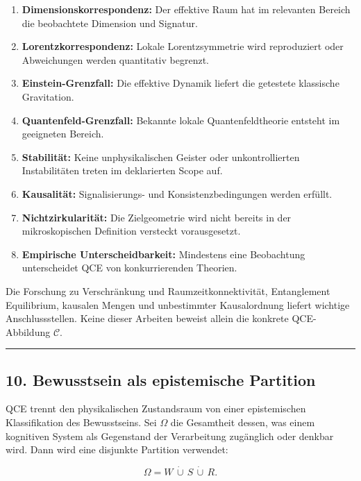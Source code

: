 \documentclass[
  11pt,
  a4paper,
]{article}
\providecommand{\tightlist}{%
  \setlength{\itemsep}{0pt}\setlength{\parskip}{0pt}}
\begin{document}
\begin{enumerate}
\def\labelenumi{\arabic{enumi}.}
\tightlist
\item
  \textbf{Dimensionskorrespondenz:} Der effektive Raum hat im relevanten
  Bereich die beobachtete Dimension und Signatur.
\item
  \textbf{Lorentzkorrespondenz:} Lokale Lorentzsymmetrie wird
  reproduziert oder Abweichungen werden quantitativ begrenzt.
\item
  \textbf{Einstein-Grenzfall:} Die effektive Dynamik liefert die
  getestete klassische Gravitation.
\item
  \textbf{Quantenfeld-Grenzfall:} Bekannte lokale Quantenfeldtheorie
  entsteht im geeigneten Bereich.
\item
  \textbf{Stabilität:} Keine unphysikalischen Geister oder
  unkontrollierten Instabilitäten treten im deklarierten Scope auf.
\item
  \textbf{Kausalität:} Signalisierungs- und Konsistenzbedingungen werden
  erfüllt.
\item
  \textbf{Nichtzirkularität:} Die Zielgeometrie wird nicht bereits in
  der mikroskopischen Definition versteckt vorausgesetzt.
\item
  \textbf{Empirische Unterscheidbarkeit:} Mindestens eine Beobachtung
  unterscheidet QCE von konkurrierenden Theorien.
\end{enumerate}

Die Forschung zu Verschränkung und Raumzeitkonnektivität, Entanglement
Equilibrium, kausalen Mengen und unbestimmter Kausalordnung liefert
wichtige Anschlussstellen. Keine dieser Arbeiten beweist allein die
konkrete QCE-Abbildung \(\mathcal C\).

\begin{center}\rule{0.5\linewidth}{0.5pt}\end{center}

\subsection{10. Bewusstsein als epistemische
Partition}\label{bewusstsein-als-epistemische-partition}

QCE trennt den physikalischen Zustandsraum von einer epistemischen
Klassifikation des Bewusstseins. Sei \(\Omega\) die Gesamtheit dessen,
was einem kognitiven System als Gegenstand der Verarbeitung zugänglich
oder denkbar wird. Dann wird eine disjunkte Partition verwendet:

\[
\Omega=W\,\dot\cup\,S\,\dot\cup\,R.
\]
\end{document}
